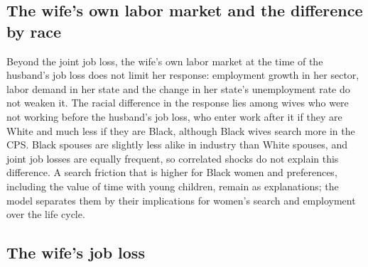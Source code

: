 \subsection{The wife's own labor market and the difference by race}

Beyond the joint job loss, the wife's own labor market at the time of the husband's job loss does not limit her
response: employment growth in her sector, labor demand in her state and the change in her state's unemployment rate do
not weaken it. The racial difference in the response lies among wives who were not working before the husband's job
loss, who enter work after it if they are White and much less if they are Black, although Black wives search more in
the CPS. Black spouses are slightly less alike in industry than White spouses, and joint job losses are equally
frequent, so correlated shocks do not explain this difference. A search friction that is higher for Black women and
preferences, including the value of time with young children, remain as explanations; the model separates them by
their implications for women's search and employment over the life cycle.

\subsection{The wife's job loss}

